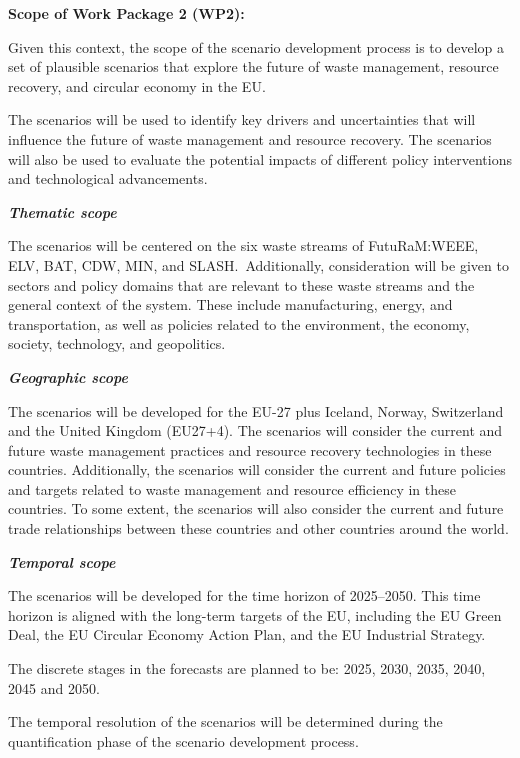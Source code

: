 \vspace{3em}

\textbf{Scope of Work Package 2 (WP2):}

Given this context, the scope of the scenario development process is to develop a set of plausible scenarios that explore the future of waste management, resource recovery, and circular economy in the EU.

The scenarios will be used to identify key drivers and uncertainties that will influence the future of waste management and resource recovery. The scenarios will also be used to evaluate the potential impacts of different policy interventions and technological advancements.


\textbf{\textit{Thematic scope}}

The scenarios will be centered on the six waste streams of FutuRaM:\@ WEEE, ELV, BAT, CDW, MIN, and SLASH.\ Additionally, consideration will be given to sectors and policy domains that are relevant to these waste streams and the general context of the system. These include manufacturing, energy, and transportation, as well as policies related to the environment, the economy, society, technology, and geopolitics.

\textbf{\textit{Geographic scope}}

The scenarios will be developed for the EU-27 plus Iceland, Norway, Switzerland and the United Kingdom (EU27+4). The scenarios will consider the current and future waste management practices and resource recovery technologies in these countries.
\vspace{\baselineskip}
Additionally, the scenarios will consider the current and future policies and targets related to waste management and resource efficiency in these countries. To some extent, the scenarios will also consider the current and future trade relationships between these countries and other countries around the world.

\textbf{\textit{Temporal scope}}

The scenarios will be developed for the time horizon of 2025--2050. This time horizon is aligned with the long-term targets of the EU, including the EU Green Deal, the EU Circular Economy Action Plan, and the EU Industrial Strategy.

The discrete stages in the forecasts are planned to be: 2025, 2030, 2035, 2040, 2045 and 2050.

The temporal resolution of the scenarios will be determined during the quantification phase of the scenario development process.


